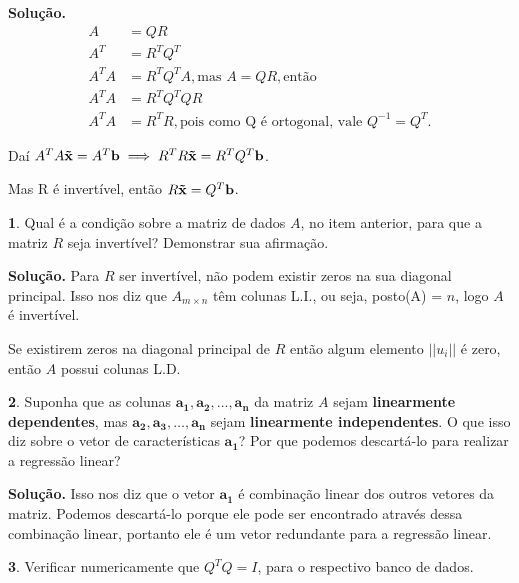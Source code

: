 \documentclass[a4paper, 12pt]{article}
\theoremstyle{definition}
\newtheorem{questao}{}
\newenvironment{solucao}{\noindent\textbf{Solução.}}{}
\theoremstyle{remark}
\begin{document}
\begin{solucao}
\begin{align*}
A &= QR \\
A^T &= R^TQ^T\\
A^TA &= R^TQ^TA, \text{mas } A = QR, \text{então }\\
A^TA &= R^TQ^TQR\\
A^TA &= R^TR, \text{pois como Q é ortogonal, vale } Q^{-1} = Q^T.
\end{align*}

Daí $A^TA\mathbf{\Tilde{x}} = A^T\mathbf{b} \implies R^TR\mathbf{\Tilde{x}} = R^TQ^T\mathbf{b}$.
    
Mas R é invertível, então $R\mathbf{\Tilde{x}} = Q^T\mathbf{b}$.
    
\end{solucao}

\begin{questao}
    Qual é a condição sobre a matriz de dados $A$, no item anterior, para que a matriz $R$ seja invertível? Demonstrar sua afirmação.
\end{questao}

\begin{solucao}
    Para $R$ ser invertível, não podem existir zeros na sua diagonal principal. Isso nos diz que $A_{m \times n}$ têm colunas L.I., ou seja, posto(A) = $n$, logo $A$ é invertível.
    
    Se existirem zeros na diagonal principal de $R$ então algum elemento $||u_i||$ é zero, então $A$ possui colunas L.D.
\end{solucao}

\begin{questao}
    Suponha que as colunas $\mathbf{a_1, a_2, \ldots, a_n}$ da matriz $A$ sejam \textbf{linearmente dependentes}, mas $\mathbf{a_2, a_3, \ldots, a_n}$ sejam \textbf{linearmente independentes}. O que isso diz sobre o vetor de características $\mathbf{a_1}$? Por que podemos descartá-lo para realizar a regressão linear?
\end{questao}

\begin{solucao}
    Isso nos diz que o vetor $\mathbf{a_1}$ é combinação linear dos outros vetores da matriz. Podemos descartá-lo porque ele pode ser encontrado através dessa combinação linear, portanto ele é um vetor redundante para a regressão linear.
\end{solucao}

\begin{questao}
    Verificar numericamente que $Q^TQ = I$, para o respectivo banco de dados.
\end{questao}
\end{document}
